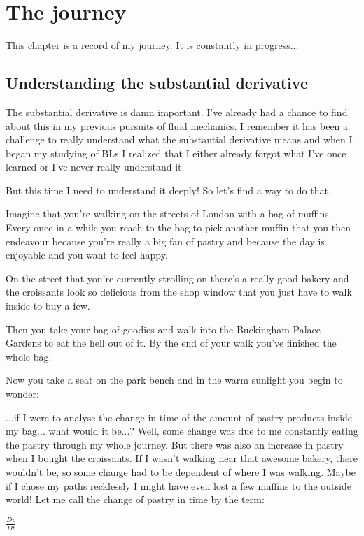 \documentclass[12pt]{report}
\begin{document}
\chapter{The journey}


This chapter is a record of my journey. It is constantly in progress...

\section{Understanding the substantial derivative} \label{chap:deriv}

The substantial derivative is damn important. I've already had a chance to find about this in my previous pursuits of fluid mechanics. I remember it has been a challenge to really understand what the substantial derivative means and when I began my studying of BLs I realized that I either already forgot what I've once learned or I've never really understand it.

But this time I need to understand it deeply! So let's find a way to do that.

Imagine that you're walking on the streets of London with a bag of muffins. Every once in a while you reach to the bag to pick another muffin that you then endeavour because you're really a big fan of pastry and because the day is enjoyable and you want to feel happy.

On the street that you're currently strolling on there's a really good bakery and the croissants look so delicious from the shop window that you just have to walk inside to buy a few.

Then you take your bag of goodies and walk into the Buckingham Palace Gardens to eat the hell out of it. By the end of your walk you've finished the whole bag.

Now you take a seat on the park bench and in the warm sunlight you begin to wonder:

...if I were to analyse the change in time of the amount of pastry products inside my bag... what would it be...? Well, some change was due to me constantly eating the pastry through my whole journey. But there was also an increase in pastry when I bought the croissants. If I wasn't walking near that awesome bakery, there wouldn't be, so some change had to be dependent of where I was walking. Maybe if I chose my paths recklessly I might have even lost a few muffins to the outside world! Let me call the change of pastry in time by the term:

$\frac{Dp}{Dt}$
\end{document}
